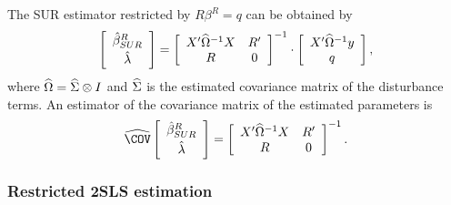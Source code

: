 The SUR estimator restricted by $R \beta^R = q$ can be obtained by
\begin{equation}
   \left[ \begin{array}{c}
      \hat{\beta}^R_{SUR} \\[0.2em] \hat{\lambda}
   \end{array} \right]
   =
   \left[ \begin{array}{cc}
      X' \widehat{\Omega}^{-1} X & R' \\
      R & 0
   \end{array} \right]^{-1}
   \cdot
   \left[ \begin{array}{c}
      X' \widehat{\Omega}^{-1} y \\ q
   \end{array} \right] ,
\end{equation}
where $\widehat{\Omega} = \widehat{\Sigma} \otimes I$ and
$\widehat{\Sigma}$ is the estimated covariance matrix of the disturbance terms.
An estimator of the covariance matrix of the estimated parameters is
\begin{equation}
   \COVHat
   \left[ \begin{array}{c}
      \bHat^R_{SUR} \\[0.2em] \lHat
   \end{array} \right] 
   = 
   \left[ \begin{array}{cc}
      X' \OHat^{-1} X & R' \\
      R & 0
   \end{array} \right]^{-1} .
\end{equation}

\subsubsection{Restricted 2SLS estimation}

